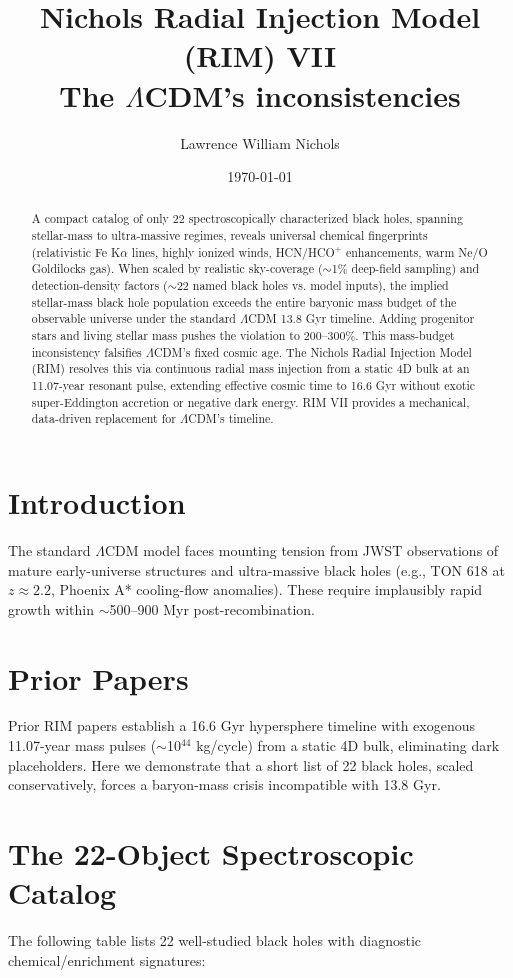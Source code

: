 \documentclass[12pt]{article}
\title{Nichols Radial Injection Model (RIM) VII \\ The $\Lambda$CDM’s inconsistencies}
\author{Lawrence William Nichols}
\date{\today}
\begin{document}
\maketitle

\begin{abstract}
A compact catalog of only 22 spectroscopically characterized black holes, spanning stellar-mass to ultra-massive regimes, reveals universal chemical fingerprints (relativistic Fe K$\alpha$ lines, highly ionized winds, HCN/HCO$^+$ enhancements, warm Ne/O Goldilocks gas). When scaled by realistic sky-coverage ($\sim$1\% deep-field sampling) and detection-density factors ($\sim$22 named black holes vs. model inputs), the implied stellar-mass black hole population exceeds the entire baryonic mass budget of the observable universe under the standard $\Lambda$CDM 13.8 Gyr timeline. Adding progenitor stars and living stellar mass pushes the violation to 200--300\%. This mass-budget inconsistency falsifies $\Lambda$CDM's fixed cosmic age. The Nichols Radial Injection Model (RIM) resolves this via continuous radial mass injection from a static 4D bulk at an 11.07-year resonant pulse, extending effective cosmic time to 16.6 Gyr without exotic super-Eddington accretion or negative dark energy. RIM VII provides a mechanical, data-driven replacement for $\Lambda$CDM's timeline.
\end{abstract}

\section{Introduction}
The standard $\Lambda$CDM model faces mounting tension from JWST observations of mature early-universe structures and ultra-massive black holes (e.g., TON 618 at $z\approx2.2$, Phoenix A* cooling-flow anomalies). These require implausibly rapid growth within $\sim$500--900 Myr post-recombination.

\section{Prior Papers}
Prior RIM papers \citep{rimI,rimII,rimIII,rimIV,rimV,rimVI} establish a 16.6 Gyr hypersphere timeline with exogenous 11.07-year mass pulses ($\sim$10$^{44}$ kg/cycle) from a static 4D bulk, eliminating dark placeholders. Here we demonstrate that a short list of 22 black holes, scaled conservatively, forces a baryon-mass crisis incompatible with 13.8 Gyr.

\section{The 22-Object Spectroscopic Catalog}
The following table lists 22 well-studied black holes with diagnostic chemical/enrichment signatures:
\end{document}
